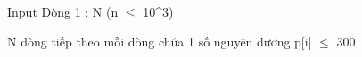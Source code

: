 Input
Dòng 1 : N (n  $\le$  10^3)

N dòng tiếp theo mỗi dòng chứa 1 số nguyên dương p[i]  $\le$  300